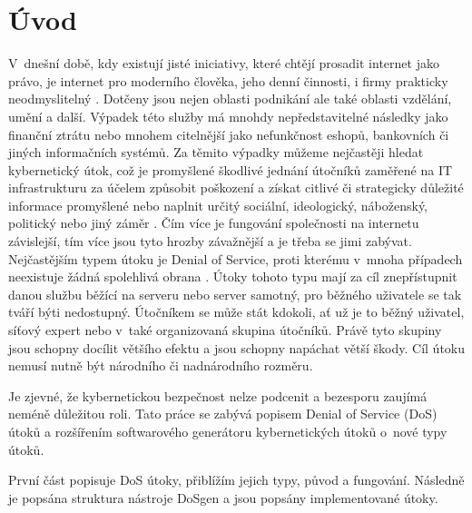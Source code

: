 \chapter*{Úvod}
{}


V~dnešní době, kdy existují jisté iniciativy, které chtějí prosadit internet jako právo, je internet 
pro moderního člověka, jeho denní činnosti, i firmy prakticky neodmyslitelný \cite{pirati_internet}. 
Dotčeny jsou nejen oblasti podnikání ale také oblasti vzdělání, umění a další. Výpadek této služby má 
mnohdy nepředstavitelné následky jako finanční ztrátu nebo mnohem citelnější jako nefunkčnost eshopů, 
bankovních či jiných informačních systémů. Za těmito výpadky můžeme nejčastěji hledat kybernetický útok, 
což je promyšlené škodlivé jednání útočníků zaměřené na  IT  infrastrukturu  za  účelem  způsobit 
poškození  a  získat  citlivé  či  strategicky  důležité 
informace promyšlené nebo naplnit určitý sociální, ideologický, náboženský, politický nebo jiný záměr 
\cite{Jirasek2012}. Čím více je fungování společnosti na internetu závislejší, tím více jsou tyto hrozby 
závažnější a je třeba se jimi zabývat. Nejčastějším typem útoku je Denial of Service, proti kterému 
v~mnoha případech neexistuje  žádná spolehlivá obrana \cite{akamai_q2_2017}. Útoky tohoto typu mají 
za cíl znepřístupnit danou službu běžící na serveru nebo server samotný, pro běžného uživatele se tak 
tváří býti nedostupný. Útočníkem se může stát kdokoli, ať už je to běžný uživatel, síťový expert nebo 
v~také organizovaná skupina útočníků. Právě tyto skupiny jsou schopny docílit většího efektu a jsou 
schopny napáchat větší škody. Cíl útoku nemusí nutně být národního či nadnárodního rozměru.

Je zjevné, že kybernetickou bezpečnost nelze podcenit a bezesporu zaujímá neméně důležitou roli. Tato 
práce se zabývá popisem Denial of Service (DoS) útoků a rozšířením softwarového generátoru kybernetických útoků 
o~nové typy útoků.

První část popisuje DoS útoky, přiblížím jejich typy, původ a fungování. Následně je popsána struktura nástroje DoSgen a jsou popsány implementované útoky.
